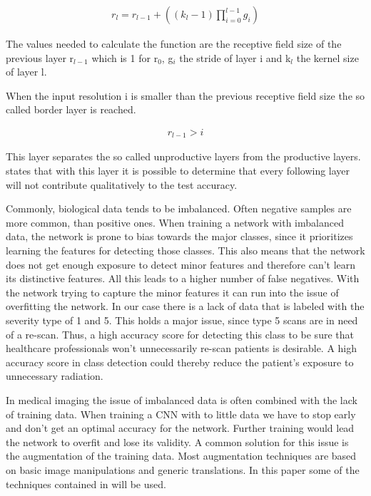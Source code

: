 \documentclass[
a4paper, 
12pt,
grayscalebody, %
abstract=on,
twoside, BCOR10mm, 12pt, DIV13,headinclude, footexclude, final, abstracton, openright
]{ibireprt}
\numberwithin{equation}{chapter}
\numberwithin{table}{chapter}
\numberwithin{figure}{chapter}
\numberwithin{algorithm}{chapter}
\numberwithin{example}{chapter}
\numberwithin{example}{chapter}
\begin{document}
\begin{align}
	r_l = r_{l-1}+((k_l-1)\prod_{i=0}^{l-1}g_i)
\end{align}

The values needed to calculate the function are the receptive field size of the previous layer r$_{l-1}$ which is 1 for r$_0$, g$_i$ the stride of layer i and k$_l$ the kernel size of layer l.

When the input resolution i is smaller than the previous receptive field size the so called border layer is reached.

\begin{align}
	r_{l-1} > i
\end{align} 

This layer separates the so called unproductive layers from the productive layers. \cite{Richter2021} states that with this layer it is possible to determine that every following layer will not contribute qualitatively to the test accuracy.


Commonly, biological data tends to be imbalanced. Often negative samples are more common, than positive ones. \cite{Alzubaidi2021} When training a network with imbalanced data, the network is prone to bias towards the major classes, since it prioritizes learning the features for detecting those classes. This also means that the network does not get enough exposure to detect minor features and therefore can't learn its distinctive features. All this leads to a higher number of false negatives. With the network trying to capture the minor features it can run into the issue of overfitting the network. In our case there is a lack of data that is labeled with the severity type of 1 and 5. This holds a major issue, since type 5 scans are in need of a re-scan. Thus, a high accuracy score for detecting this class to be sure that healthcare professionals won't unnecessarily re-scan patients is desirable. A high accuracy score in class detection could thereby reduce the patient's exposure to unnecessary radiation.%


In medical imaging the issue of imbalanced data is often combined with the lack of training data. When training a CNN with to little data we have to stop early and don't get an optimal accuracy for the network. Further training would lead the network to overfit and lose its validity. A common solution for this issue is the augmentation of the training data. Most augmentation techniques are based on basic image manipulations and generic translations. In this paper some of the techniques contained in \cite{Shorten2019} will be used.
\end{document}
